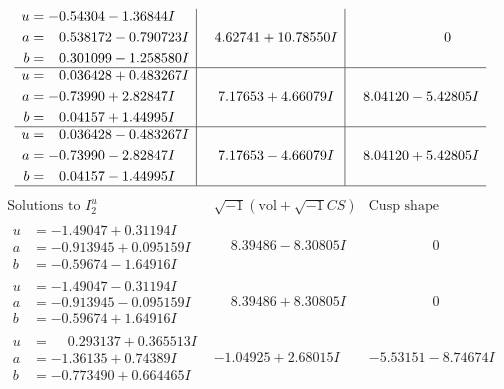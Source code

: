 \documentclass[1p]{elsarticle_modified}
\theoremstyle{definition}
\newcommand{\I}{\sqrt{-1}}
\begin{document}
$$\begin{array}{c|c|c}
\begin{aligned}
u &= -0.54304 - 1.36844 I \\
a &= \phantom{-}0.538172 - 0.790723 I \\
b &= \phantom{-}0.301099 - 1.258580 I\end{aligned}
 & \phantom{-}4.62741 + 10.78550 I & \phantom{-0.000000 } 0 \\ \hline\begin{aligned}
u &= \phantom{-}0.036428 + 0.483267 I \\
a &= -0.73990 + 2.82847 I \\
b &= \phantom{-}0.04157 + 1.44995 I\end{aligned}
 & \phantom{-}7.17653 + 4.66079 I & \phantom{-}8.04120 - 5.42805 I \\ \hline\begin{aligned}
u &= \phantom{-}0.036428 - 0.483267 I \\
a &= -0.73990 - 2.82847 I \\
b &= \phantom{-}0.04157 - 1.44995 I\end{aligned}
 & \phantom{-}7.17653 - 4.66079 I & \phantom{-}8.04120 + 5.42805 I\\
 \hline 
 \end{array}$$\newpage$$\begin{array}{c|c|c}  
\text{Solutions to }I^u_{2}& \I (\text{vol} + \sqrt{-1}CS) & \text{Cusp shape}\\
 \hline 
\begin{aligned}
u &= -1.49047 + 0.31194 I \\
a &= -0.913945 + 0.095159 I \\
b &= -0.59674 - 1.64916 I\end{aligned}
 & \phantom{-}8.39486 - 8.30805 I & \phantom{-0.000000 } 0 \\ \hline\begin{aligned}
u &= -1.49047 - 0.31194 I \\
a &= -0.913945 - 0.095159 I \\
b &= -0.59674 + 1.64916 I\end{aligned}
 & \phantom{-}8.39486 + 8.30805 I & \phantom{-0.000000 } 0 \\ \hline\begin{aligned}
u &= \phantom{-}0.293137 + 0.365513 I \\
a &= -1.36135 + 0.74389 I \\
b &= -0.773490 + 0.664465 I\end{aligned}
 & -1.04925 + 2.68015 I & -5.53151 - 8.74674 I \\ \hline\begin{aligned}

\end{aligned}
\end{array}$$
\end{document}
